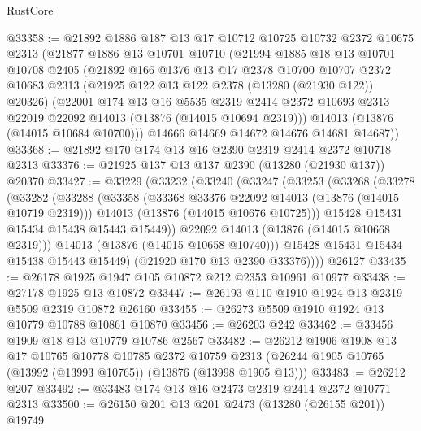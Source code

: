 \begin{lexlean}{RustCore}
\begin{coremodule}
@33358 := @21892
    @1886
    @187
    @13
    @17
    @10712
    @10725
    @10732
    @2372
    @10675
    @2313
    (@21877
      @1886
      @13
      @10701
      @10710
      (@21994
        @1885
        @18
        @13
        @10701
        @10708
        @2405
        (@21892
          @166
          @1376
          @13
          @17
          @2378
          @10700
          @10707
          @2372
          @10683
          @2313
          (@21925 @122 @13 @122 @2378 (@13280 (@21930 @122)) @20326)
          (@22001
            @174
            @13
            @16
            @5535
            @2319
            @2414
            @2372
            @10693
            @2313
            @22019
            @22092
            @14013
            (@13876 (@14015 @10694 @2319)))
          @14013
          (@13876 (@14015 @10684 @10700)))
        @14666
        @14669
        @14672
        @14676
        @14681
        @14687))
@33368 := @21892 @170 @174 @13 @16 @2390 @2319 @2414 @2372 @10718 @2313
@33376 := @21925 @137 @13 @137 @2390 (@13280 (@21930 @137)) @20370
@33427 := @33229
    (@33232
      (@33240
        (@33247
          (@33253
            (@33268
              (@33278
                (@33282
                  (@33288
                    (@33358
                      (@33368 @33376 @22092 @14013 (@13876 (@14015 @10719 @2319)))
                      @14013
                      (@13876 (@14015 @10676 @10725)))
                    @15428
                    @15431
                    @15434
                    @15438
                    @15443
                    @15449))
                @22092
                @14013
                (@13876 (@14015 @10668 @2319)))
              @14013
              (@13876 (@14015 @10658 @10740)))
            @15428
            @15431
            @15434
            @15438
            @15443
            @15449)
          (@21920 @170 @13 @2390 @33376))))
    @26127
@33435 := @26178 @1925 @1947 @105 @10872 @212 @2353 @10961 @10977
@33438 := @27178 @1925 @13 @10872
@33447 := @26193 @110 @1910 @1924 @13 @2319 @5509 @2319 @10872 @26160
@33455 := @26273 @5509 @1910 @1924 @13 @10779 @10788 @10861 @10870
@33456 := @26203 @242
@33462 := @33456 @1909 @18 @13 @10779 @10786 @2567
@33482 := @26212
    @1906
    @1908
    @13
    @17
    @10765
    @10778
    @10785
    @2372
    @10759
    @2313
    (@26244 @1905 @10765 (@13992 (@13993 @10765)) (@13876 (@13998 @1905 @13)))
@33483 := @26212 @207
@33492 := @33483 @174 @13 @16 @2473 @2319 @2414 @2372 @10771 @2313
@33500 := @26150 @201 @13 @201 @2473 (@13280 (@26155 @201)) @19749

\end{coremodule}
\end{lexlean}
